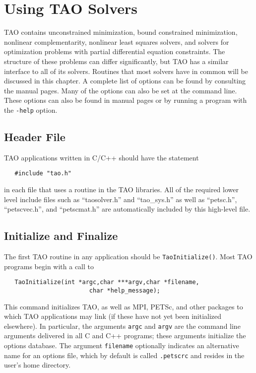 %
%

\chapter{Using TAO Solvers}
\label{chapter:tao_solver}

TAO contains unconstrained minimization, bound constrained minimization, 
nonlinear complementarity, nonlinear least squares solvers, and solvers
for optimization problems with partial differential equation constraints.
The structure of these problems can differ significantly, but TAO has a 
similar interface to all of its solvers.  
Routines that most solvers have in common will be discussed in 
this chapter.
A complete list of options can be found by consulting the manual pages.
Many of the options can also be set at the command line.  These options
can also be found in manual pages or by
running a program with the {\tt -help} option.

\section{Header File}

TAO applications written in C/C++ should have the statement 
\begin{verbatim}
   #include "tao.h"
\end{verbatim}
\noindent
in each file that uses a routine in the TAO libraries.
All of the required lower level include files such as ``taosolver.h''
and ``tao\_sys.h'' as well as ``petsc.h'', ``petscvec.h'', and ``petscmat.h''
are automatically included by this high-level file.


\section{Initialize and Finalize}

The first TAO routine in any application should be {\tt TaoInitialize()}.
Most TAO programs begin with a call to
\begin{verbatim}
   TaoInitialize(int *argc,char ***argv,char *filename, 
                        char *help_message);
\end{verbatim}
\noindent
This command initializes TAO, as well as MPI, PETSc, and other packages
to which TAO applications may link (if these have not yet
been initialized elsewhere).  
In particular, the arguments {\tt argc} and 
{\tt argv} are the command line arguments delivered in all C and C++
programs; these arguments initialize the options database.  
 The argument {\tt filename}
optionally indicates an alternative name for an options file, which by
default is called {\tt .petscrc} and resides in the user's home directory.

